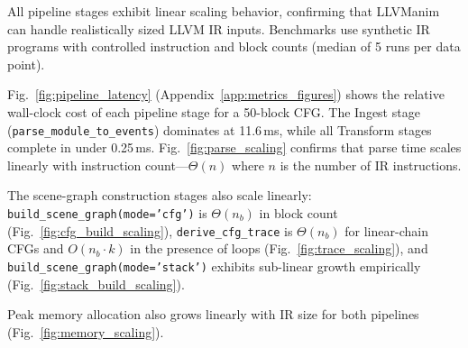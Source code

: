 All pipeline stages exhibit linear scaling behavior, confirming that LLVManim can handle realistically sized LLVM IR inputs. Benchmarks use synthetic IR programs with controlled instruction and block counts (median of 5 runs per data point).

Fig.~\ref{fig:pipeline_latency} (Appendix~\ref{app:metrics_figures}) shows the relative wall-clock cost of each pipeline stage for a 50-block CFG. The Ingest stage (\texttt{parse\_module\_to\_events}) dominates at 11.6\,ms, while all Transform stages complete in under 0.25\,ms. Fig.~\ref{fig:parse_scaling} confirms that parse time scales linearly with instruction count---$\Theta(n)$ where $n$ is the number of IR instructions.

The scene-graph construction stages also scale linearly: \texttt{build\_scene\_graph(mode='cfg')} is $\Theta(n_b)$ in block count (Fig.~\ref{fig:cfg_build_scaling}), \texttt{derive\_cfg\_trace} is $\Theta(n_b)$ for linear-chain CFGs and $O(n_b \cdot k)$ in the presence of loops (Fig.~\ref{fig:trace_scaling}), and \texttt{build\_scene\_graph(mode='stack')} exhibits sub-linear growth empirically (Fig.~\ref{fig:stack_build_scaling}).

Peak memory allocation also grows linearly with IR size for both pipelines (Fig.~\ref{fig:memory_scaling}).
